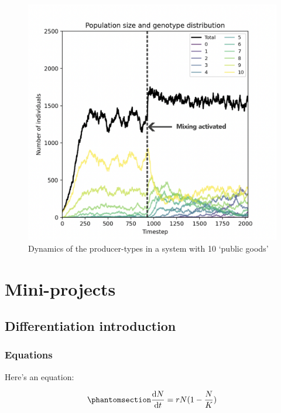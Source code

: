 \documentclass[
  letterpaper,
  DIV=11,
  numbers=noendperiod]{scrreprt}
\theoremstyle{definition}
\theoremstyle{remark}
\begin{document}
\begin{figure}[H]

{\centering \includegraphics{images/evo_pract3_mix.png}

}

\caption{Dynamics of the producer-types in a system with 10 `public
goods'}

\end{figure}%

\part{Mini-projects}

\chapter{Differentiation
introduction}\label{differentiation-introduction-1}

\section{Equations}\label{equations-11}

Here's an equation:

\begin{equation}\phantomsection\label{eq-log}{ 
\frac{\mathrm{d}N}{\mathrm{d}t} = rN(1 - \frac{N}{K}) 
}\end{equation}
\end{document}
